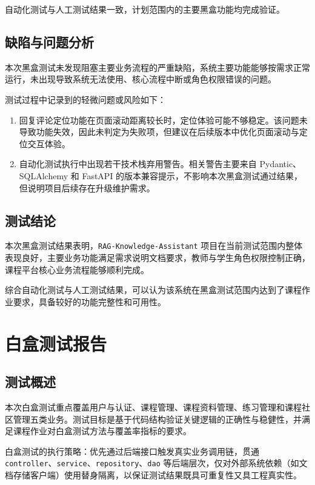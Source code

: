 \documentclass[12pt,a4paper]{ctexart}
\begin{document}
自动化测试与人工测试结果一致，计划范围内的主要黑盒功能均完成验证。

\subsection{缺陷与问题分析}

本次黑盒测试未发现阻塞主要业务流程的严重缺陷，系统主要功能能够按需求正常运行，未出现导致系统无法使用、核心流程中断或角色权限错误的问题。

测试过程中记录到的轻微问题或风险如下：

\begin{enumerate}
  \item 回复评论定位功能在页面滚动距离较长时，定位体验可能不够稳定。该问题未导致功能失效，因此未判定为失败项，但建议在后续版本中优化页面滚动与定位交互体验。
  \item 自动化测试执行中出现若干技术栈弃用警告。相关警告主要来自 Pydantic、SQLAlchemy 和 FastAPI 的版本兼容提示，不影响本次黑盒测试通过结果，但说明项目后续存在升级维护需求。
\end{enumerate}

\subsection{测试结论}

本次黑盒测试结果表明，\texttt{RAG-Knowledge-Assistant} 项目在当前测试范围内整体表现良好，主要业务功能满足需求说明文档要求，教师与学生角色权限控制正确，课程平台核心业务流程能够顺利完成。

综合自动化测试与人工测试结果，可以认为该系统在黑盒测试范围内达到了课程作业要求，具备较好的功能完整性和可用性。

\section{白盒测试报告}

\subsection{测试概述}

本次白盒测试重点覆盖用户与认证、课程管理、课程资料管理、练习管理和课程社区管理五类业务。测试目标是基于代码结构验证关键逻辑的正确性与稳健性，并满足课程作业对白盒测试方法与覆盖率指标的要求。

白盒测试的执行策略：优先通过后端接口触发真实业务调用链，贯通 \texttt{controller}、\texttt{service}、\texttt{repository}、\texttt{dao} 等后端层次，仅对外部系统依赖（如文档存储客户端）使用替身隔离，以保证测试结果既具可重复性又具工程真实性。
\end{document}
